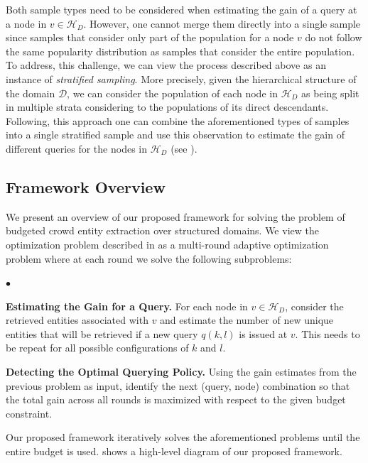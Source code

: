 \documentclass{vldb}
\newcommand{\squishlist}{
   \begin{list}{$\bullet$}
    {
      \setlength{\itemsep}{0pt}
      \setlength{\parsep}{3pt}
      \setlength{\topsep}{3pt}
      \setlength{\partopsep}{0pt}
      \setlength{\leftmargin}{1.5em}
      \setlength{\labelwidth}{1em}
      \setlength{\labelsep}{0.5em} } }
\newcommand{\squishend}{
    \end{list}  }
\newcommand{\domain}{\mathcal{D}}
\newcommand{\hierarchy}{\mathcal{H}_D}
\begin{document}
Both sample types need to be considered when estimating the gain of a query at a node in $v \in \hierarchy$. However, one cannot merge them directly into a single sample since samples that consider only part of the population for a node $v$ do not follow the same popularity distribution as samples that consider the entire population. To address, this challenge, we can view the process described above as an instance of {\em stratified sampling}. More precisely, given the hierarchical structure of the domain $\domain$, we can consider the population of each node in $\hierarchy$ as being split in multiple strata considering to the populations of its direct descendants. Following, this approach one can combine the aforementioned types of samples into a single stratified sample and use this observation to estimate the gain of different queries for the nodes in $\hierarchy$ (see ).

\subsection{Framework Overview}
\label{sec:framework}
We present an overview of our proposed framework for solving the problem of budgeted crowd entity extraction over structured domains. We view the optimization problem described in  as a multi-round adaptive optimization problem where at each round we solve the following subproblems: 
\squishlist 
\item \textbf{Estimating the Gain for a Query.} For each node in $v \in \hierarchy$, consider the retrieved entities associated with $v$ and estimate the number of new unique entities that will be retrieved if a new query $q(k,l)$ is issued at $v$. This needs to be repeat for all possible configurations of $k$ and $l$.
\item \textbf{Detecting the Optimal Querying Policy.} Using the gain estimates from the previous problem as input, identify the next (query, node) combination so that the total gain across all rounds is maximized with respect to the given budget constraint. 
\squishend
Our proposed framework iteratively solves the aforementioned problems until the entire budget is used.  shows a high-level diagram of our proposed framework.
\end{document}
